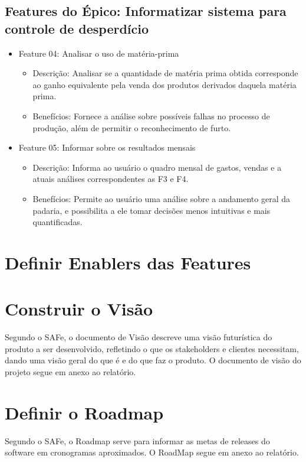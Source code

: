 \subsection{Features do Épico: Informatizar sistema para controle de desperdício}

\begin{itemize}

\item Feature 04: Analisar o uso de matéria-prima
\begin{itemize}
	\item Descrição: Analisar se a quantidade de matéria prima obtida corresponde ao ganho equivalente pela venda
	dos produtos derivados daquela matéria prima.
	\item Benefícios: Fornece a análise sobre possíveis falhas no processo de produção, além de permitir o reconhecimento de furto.

\end{itemize}

\item Feature 05: Informar sobre os resultados mensais
\begin{itemize}
	\item Descrição: Informa ao usuário o quadro mensal de gastos, vendas e a atuais análises correspondentes as F3 e F4.
	\item Benefícios: Permite ao usuário uma análise sobre a andamento geral da padaria, e possibilita a ele tomar decisões menos
	intuitivas e mais quantificadas.
\end{itemize}

\end{itemize}

\section{Definir Enablers das Features}

\section{Construir o Visão}

Segundo o SAFe, o documento de Visão descreve uma visão futurística do produto a ser desenvolvido, refletindo o que os stakeholders e clientes necessitam, dando uma visão geral do que é e do que faz o produto.
O documento de visão do projeto segue em anexo ao relatório.


\section{Definir o Roadmap}
Segundo o SAFe, o Roadmap serve para informar as metas de releases do software em cronogramas aproximados.
O RoadMap segue em anexo ao relatório.


